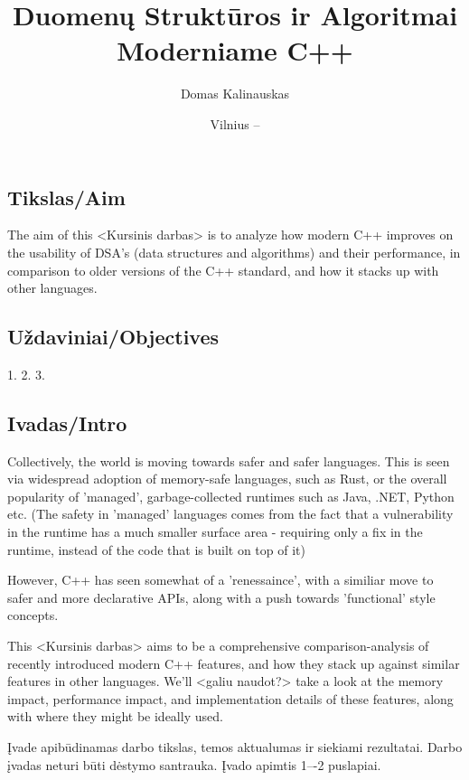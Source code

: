 \documentclass[
    english, %
]{VUMIFPSkursinis}
\title{Duomenų Struktūros ir Algoritmai Moderniame C++}
\author{Domas Kalinauskas}
\date{Vilnius – \the\year}
\begin{document}
\maketitle

\tableofcontents


\subsection{Tikslas/Aim}

The aim of this <Kursinis darbas> is to analyze how modern C++ improves on
the usability of DSA's (data structures and algorithms) and their performance, in comparison to older versions
of the C++ standard, and how it stacks up with other languages.

\subsection{Uždaviniai/Objectives}

1. 
2.
3.

\subsection{Ivadas/Intro}

Collectively, the world is moving towards safer and safer languages. This is seen via widespread adoption of memory-safe languages,
such as Rust, or the overall popularity of 'managed', garbage-collected runtimes such as Java, .NET, Python etc.
(The safety in 'managed' languages comes from the fact that a vulnerability in the runtime has a much smaller surface area - requiring only a fix in the runtime, instead of the code that is built on top of it)

However, C++ has seen somewhat of a 'renessaince', with a similiar move to safer and more declarative APIs, along with a push towards 'functional' style concepts.

This <Kursinis darbas> aims to be a comprehensive comparison-analysis of recently introduced modern C++ features, and how they stack up against similar features in other languages.
We'll <galiu naudot?> take a look at the memory impact, performance impact, and implementation details of these features, along with where they might be ideally used.

Įvade apibūdinamas darbo tikslas, temos aktualumas ir siekiami rezultatai.
Darbo įvadas neturi būti dėstymo santrauka. Įvado apimtis 1–-2 puslapiai.
\end{document}
